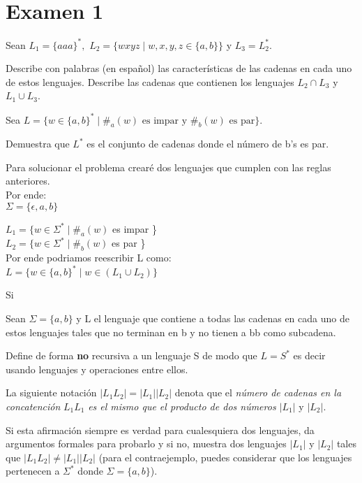 \renewcommand{\labelenumi}{\alph{enumi})}

\section*{Examen 1}

\begin{questions}
\question Sean $L_{1} = \{aaa\}^{*},$ $L_{2} = \{wxyz \mid w,x,y,z \in \{a,b\} \}$ y $L_{3} = L_{2}^{*}$.

Describe con palabras (en español) las características de las cadenas en cada uno de estos lenguajes.
Describe las cadenas que contienen los lenguajes $L_{2} \cap L_{3}$ y $L_{1} \cup L_{3}$.

\begin{solution}
    
    
    
\end{solution} 
\question Sea $L = \{w \in \{a,b\}^{*} \mid \#_{a}(w) \text{ es impar y } \#_{b} (w) \text{ es par} \}$.

Demuestra que $L^{*}$ es el conjunto de cadenas donde el n\'umero de b's es par.

\begin{solution}
    Para solucionar el problema crear\'e dos lenguajes que cumplen
    con las reglas anteriores. \\
    Por ende: \\
    $\Sigma = \{\epsilon, a,b\}$

    $L_{1} = \{w \in \Sigma^{*}\mid \#_{a}(w)$ es impar \} \\
    $L_{2} = \{w \in \Sigma^{*}\mid \#_{b}(w)$ es par \} \\

    Por ende podriamos reescribir L como: \\
    $L = \{w \in \{a,b\}^{*} \mid w \in (L_{1} \cup L_{2})\}$

    Si 

    
\end{solution} 

\question Sean $\Sigma = \{a,b\}$  y L el lenguaje que contiene a todas las cadenas en cada
uno de estos lenguajes tales que no terminan en b y no tienen a bb como subcadena.

Define de forma {\bf no} recursiva a un lenguaje S de modo que $L = S^{*}$ es decir usando lenguajes
y operaciones entre ellos.

\question La siguiente notaci\'on $|L_{1}L_{2}| = |L_{1}||L_{2}|$ denota que el {\it número de cadenas en la concatención}
$L_{1}L_{1}$ {\it es el mismo que el producto de dos n\'umeros $|L_{1}|$} y $|L_{2}|$.

Si esta afirmaci\'on siempre es verdad para cualesquiera dos lenguajes, da argumentos
formales para probarlo y si no, muestra dos lenguajes $|L_{1}|$ y $|L_{2}|$ tales que $|L_{1}L_{2}| \neq |L_{1}||L_{2}|$ (para el
contraejemplo, puedes considerar que los lenguajes pertenecen a $\Sigma^{*}$ donde $\Sigma = \{a,b\}$).
\end{questions}
